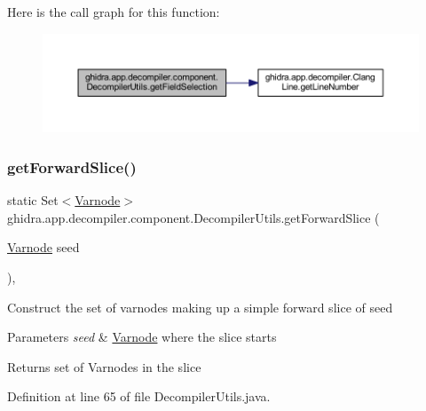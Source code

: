 Here is the call graph for this function\+:
\nopagebreak
\begin{figure}[H]
\begin{center}
\leavevmode
\includegraphics[width=350pt]{classghidra_1_1app_1_1decompiler_1_1component_1_1_decompiler_utils_a20bf8c2ccfda617209d27aed13c1ca1f_cgraph}
\end{center}
\end{figure}
\mbox{\label{classghidra_1_1app_1_1decompiler_1_1component_1_1_decompiler_utils_a95f384c1cd6328bcad6555a80a886790}} 
\subsubsection{\texorpdfstring{getForwardSlice()}{getForwardSlice()}}
{\footnotesize\ttfamily static Set$<$\mbox{\hyperlink{class_varnode}{Varnode}}$>$ ghidra.\+app.\+decompiler.\+component.\+Decompiler\+Utils.\+get\+Forward\+Slice (\begin{DoxyParamCaption}\item[{\mbox{\hyperlink{class_varnode}{Varnode}}}]{seed }\end{DoxyParamCaption})\hspace{0.3cm}{\ttfamily [inline]}, {\ttfamily [static]}}

Construct the set of varnodes making up a simple forward slice of seed 
\begin{DoxyParams}{Parameters}
{\em seed} & \mbox{\hyperlink{class_varnode}{Varnode}} where the slice starts \\
\hline
\end{DoxyParams}
\begin{DoxyReturn}{Returns}
set of Varnodes in the slice 
\end{DoxyReturn}


Definition at line 65 of file Decompiler\+Utils.\+java.

